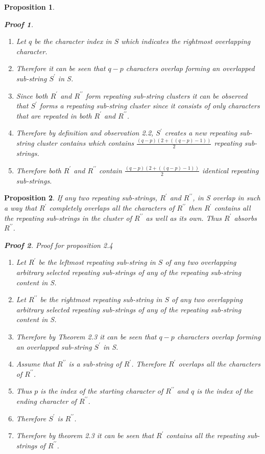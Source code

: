 \documentclass[12pt]{article}
\newtheorem{thm}{Proposition}[section]
\newtheorem{prf}{Proof}[section]
\begin{document}
\begin{flushleft}
\begin{thm}
\begin{prf}
\begin{enumerate}
				\item Let $q$ be the character index in $S$ which indicates the rightmost overlapping character.
				\item Therefore it can be seen that $q - p$ characters overlap forming an overlapped sub-string $S^{\prime}$ in S.
				\item Since both $R^{\prime}$ and $R^{\prime\prime}$ form repeating sub-string clusters it can be observed that $S^{\prime}$ forms a repeating sub-string cluster since it consists of only characters that are repeated in both $R^{\prime}$ and $R^{\prime\prime}$.
				\item Therefore by definition and observation 2.2, $S^{\prime}$ creates a new repeating sub-string cluster contains which contains $\frac{(q - p)(2 + ((q - p)-1))}{2}$ repeating sub-strings.
				\item Therefore both $R^{\prime}$ and $R^{\prime\prime}$ contain $\frac{(q - p)(2 + ((q - p)-1))}{2}$ identical repeating sub-strings.
			\end{enumerate}
		\end{prf}
	\end{thm}
	\newpage
	\begin{thm}
	If any two repeating sub-strings, $R^{\prime}$ and $R^{\prime\prime}$, in S overlap in such a way that $R^{\prime}$ completely overlaps all the characters of $R^{\prime\prime}$ then $R^{\prime}$ contains all the repeating sub-strings in the cluster of $R^{\prime\prime}$ as well as its own. Thus $R^{\prime}$ absorbs $R^{\prime\prime}$.
		\begin{prf} Proof for proposition 2.4
			\begin{enumerate}
			\item Let $R^{\prime}$ be the leftmost repeating sub-string in $S$ of any two overlapping arbitrary selected repeating sub-strings of any of the repeating sub-string content in S.  
			\item Let $R^{\prime\prime}$ be the rightmost repeating sub-string in $S$ of any two overlapping arbitrary selected repeating sub-strings of any of the repeating sub-string content in S.
			\item Therefore by Theorem 2.3 it can be seen that $q - p$ characters overlap forming an overlapped sub-string $S^{\prime}$ in S.
			\item Assume that $R^{\prime\prime}$ is a sub-string of $R^{\prime}$. Therefore  $R^{\prime}$ overlaps all the characters of $R^{\prime\prime}$.
			\item Thus $p$ is the index of the starting character of $R^{\prime\prime}$ and $q$ is the index of the ending character of $R^{\prime\prime}$.
			\item Therefore $S^{\prime}$ is $R^{\prime\prime}$.
			\item Therefore by theorem 2.3 it can be seen that $R^{\prime}$ contains all the repeating sub-strings of $R^{\prime\prime}$. 
			\end{enumerate}
		\end{prf} 
	\end{thm}
	

\end{flushleft}
\end{document}

